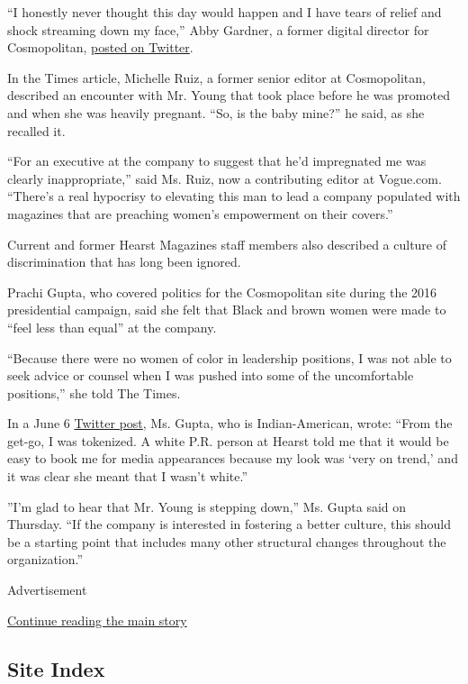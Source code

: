 ``I honestly never thought this day would happen and I have tears of
relief and shock streaming down my face,'' Abby Gardner, a former
digital director for Cosmopolitan,
\href{https://twitter.com/abbygardner/status/1286426583729942531?s=21}{posted
on Twitter}.

In the Times article, Michelle Ruiz, a former senior editor at
Cosmopolitan, described an encounter with Mr. Young that took place
before he was promoted and when she was heavily pregnant. ``So, is the
baby mine?'' he said, as she recalled it.

``For an executive at the company to suggest that he'd impregnated me
was clearly inappropriate,'' said Ms. Ruiz, now a contributing editor at
Vogue.com. ``There's a real hypocrisy to elevating this man to lead a
company populated with magazines that are preaching women's empowerment
on their covers.''

Current and former Hearst Magazines staff members also described a
culture of discrimination that has long been ignored.

Prachi Gupta, who covered politics for the Cosmopolitan site during the
2016 presidential campaign, said she felt that Black and brown women
were made to ``feel less than equal'' at the company.

``Because there were no women of color in leadership positions, I was
not able to seek advice or counsel when I was pushed into some of the
uncomfortable positions,'' she told The Times.

In a June 6
\href{https://twitter.com/prachigu/status/1269362844522426371?s=20}{Twitter
post}, Ms. Gupta, who is Indian-American, wrote: ``From the get-go, I
was tokenized. A white P.R. person at Hearst told me that it would be
easy to book me for media appearances because my look was `very on
trend,' and it was clear she meant that I wasn't white.''

''I'm glad to hear that Mr. Young is stepping down,'' Ms. Gupta said on
Thursday. ``If the company is interested in fostering a better culture,
this should be a starting point that includes many other structural
changes throughout the organization.''

Advertisement

\protect\hyperlink{after-bottom}{Continue reading the main story}

\hypertarget{site-index}{%
\subsection{Site Index}\label{site-index}}

